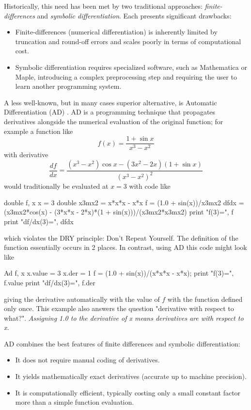 \documentclass[10pt,openany,twoside]{book}
\numberwithin{equation}{section}   %
\begin{document}
Historically, this need has been met by two traditional
approaches: \emph{finite-differences} and \emph{symbolic differentiation}.
Each presents significant drawbacks:
\begin{itemize}
\item Finite-differences (numerical differentiation)
is inherently limited by truncation and round-off errors and scales
poorly in terms of computational cost.
\item Symbolic differentiation requires specialized software, such as
Mathematica or Maple, introducing a complex preprocessing step and
requiring the user to learn another programming system.
\end{itemize}

A less well-known, but in many cases superior alternative, is
Automatic Differentiation (AD) \cite{rall1981automatic,autodiff}. AD
is a programming technique that propagates derivatives alongside the
numerical evaluation of the original function; for example
a function like
\begin{displaymath}
	f(x) = \frac{1 + \sin x}{x^3 - x^2}
\end{displaymath}
with derivative
\begin{displaymath}
	\frac{df}{dx} = \frac{(x^3 - x^2)\cos x -
		(3x^2 - 2x)(1 + \sin x)}{(x^3 - x^2)^2}
\end{displaymath}
would traditionally be evaluated at $x = 3$ with code like
\begin{example}
   double f, x
   x = 3
   double x3mx2 = x*x*x - x*x
   f = (1.0 + sin(x))/x3mx2
   dfdx = (x3mx2*cos(x) - (3*x*x - 2*x)*(1 + sin(x)))/(x3mx2*x3mx2)
   print "f(3)=", f
   print "df/dx(3)=", dfdx
\end{example}
which violates the DRY principle: Don't Repeat Yourself.
The definition of the function essentially occurs in 2 places.
In contrast, using AD this code might look like
\begin{example}
   Ad f, x
   x.value = 3
   x.der = 1
   f = (1.0 + sin(x))/(x*x*x - x*x);
   print "f(3)=", f.value
   print "df/dx(3)=", f.der
\end{example}
giving the derivative automatically with the value of $f$ with
the function defined only once.
This example also answers the question "derivative with respect to what?".
\emph{Assigning 1.0 to the derivative of x means derivatives are with respect
to x.}

AD combines the best features of finite differences and symbolic
differentiation:
\begin{itemize}
\item It does not require manual coding of derivatives.
\item It yields mathematically exact derivatives (accurate up to
machine precision).
\item It is computationally efficient, typically costing only
a small constant factor more than a simple function evaluation.
\end{itemize}
\end{document}
